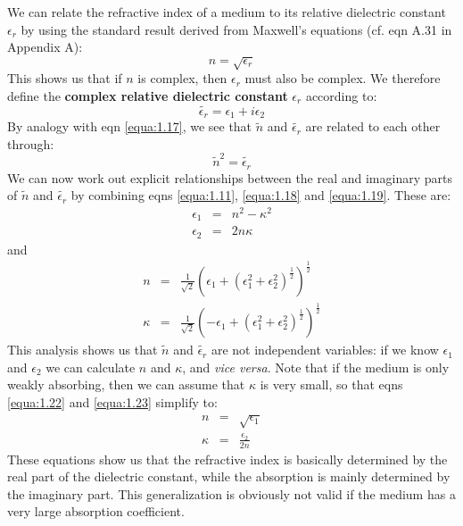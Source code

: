 \documentclass[12pt]{book}
\begin{document}
We can relate the refractive index of a medium to its relative dielectric constant $\epsilon_r$ by using the standard result derived from Maxwell's equations (cf. eqn A.31 in Appendix A):
\begin{equation}\label{equa:1.17}
  n=\sqrt{\epsilon_r}
\end{equation}
This shows us that if $n$ is complex, then $\epsilon_r$ must also be complex. We therefore define the \textbf{complex relative dielectric constant} $\epsilon_r$ according to:
\begin{equation}\label{equa:1.18}
  \tilde{\epsilon_r}=\epsilon_1+i\epsilon_2
\end{equation}
By analogy with eqn \ref{equa:1.17}, we see that $\tilde{n}$ and $\tilde{\epsilon_r}$ are related to each other through:
\begin{equation}\label{equa:1.19}
  \tilde{n}^2=\tilde{\epsilon_r}
\end{equation}
We can now work out explicit relationships between the real and imaginary parts of $\tilde{n}$ and $\tilde{\epsilon_r}$ by combining eqns \ref{equa:1.11}, \ref{equa:1.18} and \ref{equa:1.19}. These are:
\begin{eqnarray}
  \epsilon_1 &=& n^2-\kappa^2 \label{equa:1.20}\\
  \epsilon_2 &=& 2n\kappa \label{equa:1.21}
\end{eqnarray}
and
\begin{eqnarray}
  n &=& \frac{1}{\sqrt 2}(\epsilon_1+(\epsilon_1^2+\epsilon_2^2)^{\frac{1}{2}})^{\frac{1}{2}} \label{equa:1.22}\\
  \kappa &=& \frac{1}{\sqrt 2}(-\epsilon_1+(\epsilon_1^2+\epsilon_2^2)^{\frac{1}{2}})^{\frac{1}{2}} \label{equa:1.23}
\end{eqnarray}
This analysis shows us that $\tilde{n}$ and $\tilde{\epsilon_r}$ are not independent variables: if we know $\epsilon_1$ and $\epsilon_2$ we can calculate $n$ and $\kappa$, and \textit{vice versa}. Note that if the medium is only weakly absorbing, then we can assume that $\kappa$ is very small, so that eqns \ref{equa:1.22} and \ref{equa:1.23} simplify to:
\begin{eqnarray}
  n &=& \sqrt{\epsilon_1} \label{equa:1.24}\\
  \kappa &=& \frac{\epsilon_2}{2n} \label{equa:1.25}
\end{eqnarray}
These equations show us that the refractive index is basically determined by the real part of the dielectric constant, while the absorption is mainly determined by the imaginary part. This generalization is obviously not valid if the medium has a very large absorption coefficient.
\end{document}
